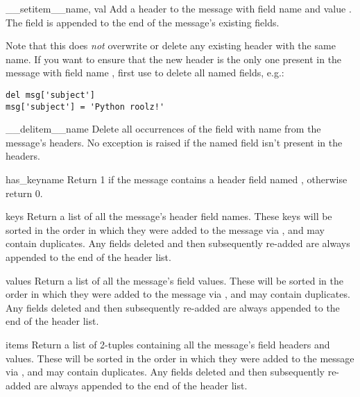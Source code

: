 \begin{methoddesc}[Message]{__setitem__}{name, val}
Add a header to the message with field name  and value
.  The field is appended to the end of the message's existing
fields.

Note that this does \emph{not} overwrite or delete any existing header
with the same name.  If you want to ensure that the new header is the
only one present in the message with field name
, first use  to delete all named
fields, e.g.:

\begin{verbatim}
del msg['subject']
msg['subject'] = 'Python roolz!'
\end{verbatim}
\end{methoddesc}

\begin{methoddesc}[Message]{__delitem__}{name}
Delete all occurrences of the field with name  from the
message's headers.  No exception is raised if the named field isn't
present in the headers.
\end{methoddesc}

\begin{methoddesc}[Message]{has_key}{name}
Return 1 if the message contains a header field named ,
otherwise return 0.
\end{methoddesc}

\begin{methoddesc}[Message]{keys}{}
Return a list of all the message's header field names.  These keys
will be sorted in the order in which they were added to the message
via , and may contain duplicates.  Any fields
deleted and then subsequently re-added are always appended to the end
of the header list.
\end{methoddesc}

\begin{methoddesc}[Message]{values}{}
Return a list of all the message's field values.  These will be sorted
in the order in which they were added to the message via
, and may contain duplicates.  Any fields
deleted and then subsequently re-added are always appended to the end
of the header list.
\end{methoddesc}

\begin{methoddesc}[Message]{items}{}
Return a list of 2-tuples containing all the message's field headers and
values.  These will be sorted in the order in which they were added to
the message via , and may contain duplicates.
Any fields deleted and then subsequently re-added are always appended
to the end of the header list.
\end{methoddesc}

